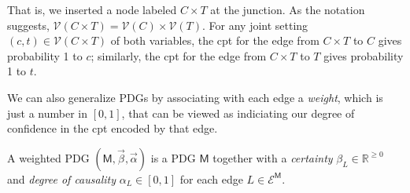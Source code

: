 \documentclass{article}
\newcommand{\commentout}[1]{\ignorespaces}
\newcommand{\V}{\mathcal V}
\newcommand{\Ed}{\mathcal E}
\newcommand{\sfM}{\mathsf M}
\numberwithin{equation}{section}
\begin{document}
That is, we inserted a node labeled $C \times T$ at the junction.  As
the notation suggests, $\V( C \times T) = \V(C) \times \V(T)$.
For any joint setting $(c,t) \in \V(C \times T)$ of both variables, the cpt for
the edge from $C \times T$ to $C$ gives probability 1 to $c$;
similarly, the cpt for the edge from $ C \times T$ to $T$ gives probability 1 to $t$.

\commentout{
This trick will not work for a BN. We need cpts to be associated with
edges, so that the projections do not get in the way of the other
information we would like to encode. In this case, we would like to
give some probabilistic information on the edge from $T$ to $C$, but
if we think of this picture as representing a BN, then $C$ would
require a table for joint settings of $(C \times T, T)$. The only
reasonable way to provide this cpt is to ignore the second component,
and use the value of $c$ determined by $C \times T$---which clearly
has no more information than the projection itself.     
}


We can also generalize PDGs by associating with each edge a
\emph{weight}, which is just a number in $[0,1]$, that can be viewed
as indiciating our degree of confidence in the cpt encoded by that edge.

\begin{defn}
	A weighted PDG $(\sfM, \vec \beta, \vec \alpha)$ is a PDG
        $\sfM$ together with a \emph{certainty} $\beta_L \in \mathbb
        R^{\geq 0}$ and \emph{degree of causality} $\alpha_L \in
        [0,1]$ for each edge $L \in \Ed^\sfM$. 
\end{defn}
\end{document}
